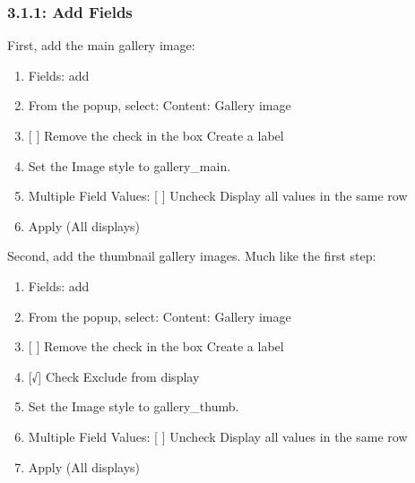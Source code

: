 \documentclass[letterpaper,10pt,english]{sphinxmanual}
\begin{document}
\subsubsection{3.1.1: Add Fields}
\label{slides:add-fields}
First, add the main gallery image:
\begin{enumerate}
\item {} 
Fields: add

\item {} 
From the popup, select: Content: Gallery image

\item {} 
{[} {]} Remove the check in the box Create a label

\item {} 
Set the Image style to gallery\_main.

\item {} 
Multiple Field Values: {[} {]} Uncheck Display all values in the same row

\item {} 
Apply (All displays)

\end{enumerate}

Second, add the thumbnail gallery images. Much like the first step:
\begin{enumerate}
\item {} 
Fields: add

\item {} 
From the popup, select: Content: Gallery image

\item {} 
{[} {]} Remove the check in the box Create a label

\item {} 
{[}√{]} Check Exclude from display

\item {} 
Set the Image style to gallery\_thumb.

\item {} 
Multiple Field Values: {[} {]} Uncheck Display all values in the same row

\item {} 
Apply (All displays)

\end{enumerate}
\end{document}
